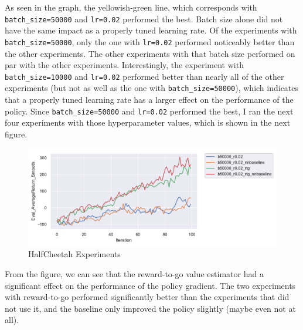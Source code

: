 \documentclass[letterpaper, 10pt]{article}
\begin{document}
As seen in the graph, the yellowish-green line, which corresponds with \texttt{batch\_size=50000} and \texttt{lr=0.02} performed
the best. Batch size alone did not have the same impact as a properly tuned learning rate. Of the experiments with
\texttt{batch\_size=50000}, only the one with \texttt{lr=0.02} performed noticeably better than the other experiments. The other
experiments with that batch size performed on par with the other experiments. Interestingly, the experiment with 
\texttt{batch\_size=10000} and \texttt{lr=0.02} performed better than nearly all of the other experiments (but not as well as
the one with \texttt{batch\_size=50000}), which indicates that a properly tuned learning rate has a larger effect on 
the performance of the policy. Since \texttt{batch\_size=50000} and \texttt{lr=0.02} performed the best, I ran the next
four experiments with those hyperparameter values, which is shown in the next figure.

\begin{figure}[h]
\centering
\includegraphics{figures/q4_optimal.pdf}
\caption{HalfCheetah Experiments}
\end{figure}

From the figure, we can see that the reward-to-go value estimator had a significant effect on the performance of the policy 
gradient. The two experiments with reward-to-go performed significantly better than the experiments that did not use it, and
the baseline only improved the policy slightly (maybe even not at all). 
\end{document}
